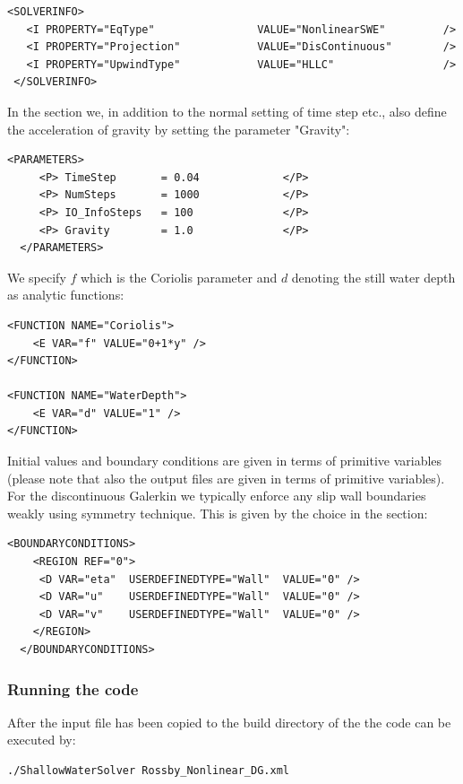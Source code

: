 \begin{lstlisting}[style=XmlStyle]
 <SOLVERINFO>
   <I PROPERTY="EqType"                VALUE="NonlinearSWE"         />
   <I PROPERTY="Projection"            VALUE="DisContinuous"        />
   <I PROPERTY="UpwindType"            VALUE="HLLC"                 />
 </SOLVERINFO>
\end{lstlisting}

In the  section we, in addition to the normal setting
of time step etc., also define the acceleration of gravity by 
setting the parameter "Gravity": 
\begin{lstlisting}[style=XmlStyle]
  <PARAMETERS>
     <P> TimeStep       = 0.04             </P>
     <P> NumSteps       = 1000             </P>
     <P> IO_InfoSteps   = 100              </P>
     <P> Gravity        = 1.0              </P>
  </PARAMETERS>
\end{lstlisting}

We specify $f$ which is the Coriolis parameter and $d$ denoting the
still water depth as analytic functions:
\begin{lstlisting}[style=XmlStyle]
<FUNCTION NAME="Coriolis">
    <E VAR="f" VALUE="0+1*y" />
</FUNCTION>

<FUNCTION NAME="WaterDepth">
    <E VAR="d" VALUE="1" />
</FUNCTION>
\end{lstlisting}

Initial values and boundary conditions are given in terms of primitive variables
(please note that also the output files are given in terms of primitive
variables). For the discontinuous Galerkin we typically enforce any slip wall boundaries
weakly using symmetry technique. This is given by the
 choice in the 
section:
\begin{lstlisting}[style=XmlStyle]
  <BOUNDARYCONDITIONS>
    <REGION REF="0">
     <D VAR="eta"  USERDEFINEDTYPE="Wall"  VALUE="0" />
     <D VAR="u"    USERDEFINEDTYPE="Wall"  VALUE="0" />
     <D VAR="v"    USERDEFINEDTYPE="Wall"  VALUE="0" />
    </REGION>
  </BOUNDARYCONDITIONS>
\end{lstlisting}

\subsubsection{Running the code}

After the input file has been copied to the build directory
of the  the code can be executed by:
\begin{lstlisting}[style=BashInputStyle]
 ./ShallowWaterSolver Rossby_Nonlinear_DG.xml
\end{lstlisting}

